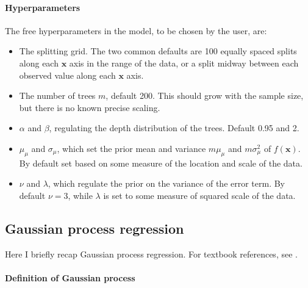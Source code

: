 \documentclass[a4paper]{article}
\theoremstyle{definition}
\begin{document}
    \paragraph{Hyperparameters}

    The free hyperparameters in the model, to be chosen by the user, are:
    \begin{itemize}

        \item The splitting grid. The two common defaults are 100 equally spaced splits along each $\mathbf x$ axis in the range of the data, or a split midway between each observed value along each $\mathbf x$ axis.
        
        \item The number of trees $m$, default 200. This should grow with the sample size, but there is no known precise scaling.
        
        \item $\alpha$ and $\beta$, regulating the depth distribution of the
        trees. Default 0.95 and 2.
        
        \item $\mu_\mu$ and $\sigma_\mu$, which set the prior mean and variance
        $m\mu_\mu$ and $m\sigma_\mu^2$ of $f(\mathbf x)$. By default set based on some measure of the location and scale of the data.
        
        \item $\nu$ and $\lambda$, which regulate the prior on the variance of the error term. By default $\nu=3$, while $\lambda$ is set to some measure of squared scale of the data.

    \end{itemize}
 
    \subsection{Gaussian process regression}
    \label{sec:gprecap}
    
    Here I briefly recap Gaussian process regression. For textbook references, see \textcite{rasmussen2006, gramacy2020, murphy2023}.

    \paragraph{Definition of Gaussian process}
    
\end{document}
